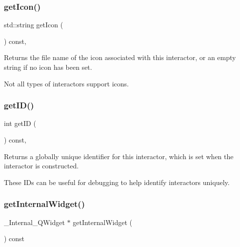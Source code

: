 \subsubsection{\texorpdfstring{get\+Icon()}{getIcon()}}
{\footnotesize\ttfamily std\+::string get\+Icon (\begin{DoxyParamCaption}{ }\end{DoxyParamCaption}) const\hspace{0.3cm}{\ttfamily [virtual]}, {\ttfamily [inherited]}}



Returns the file name of the icon associated with this interactor, or an empty string if no icon has been set. 

Not all types of interactors support icons. \mbox{\label{classGInteractor_a9c9659a6c6ba66b4107ba59c95a24241}} 
\subsubsection{\texorpdfstring{get\+I\+D()}{getID()}}
{\footnotesize\ttfamily int get\+ID (\begin{DoxyParamCaption}{ }\end{DoxyParamCaption}) const\hspace{0.3cm}{\ttfamily [virtual]}, {\ttfamily [inherited]}}



Returns a globally unique identifier for this interactor, which is set when the interactor is constructed. 

These I\+Ds can be useful for debugging to help identify interactors uniquely. \mbox{\label{classGTable_a208ce13c1da40bf0ddb509daf99d6588}} 
\subsubsection{\texorpdfstring{get\+Internal\+Widget()}{getInternalWidget()}}
{\footnotesize\ttfamily \+\_\+\+Internal\+\_\+\+Q\+Widget $\ast$ get\+Internal\+Widget (\begin{DoxyParamCaption}{ }\end{DoxyParamCaption}) const\hspace{0.3cm}{\ttfamily [virtual]}}



